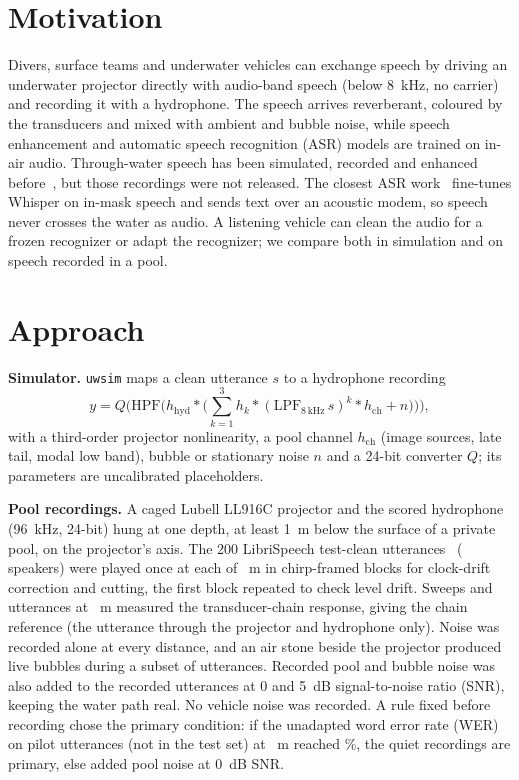 \section{Motivation}
Divers, surface teams and underwater vehicles can exchange speech by driving an underwater projector
directly with audio-band speech (below 8~kHz, no carrier) and recording it with a hydrophone. The
speech arrives reverberant, coloured by the transducers and mixed with ambient and bubble noise, while
speech enhancement and automatic speech recognition (ASR) models are trained on in-air audio.
Through-water speech has been simulated, recorded and enhanced before~\cite{nissen2017,roehrdanz2025,roehrdanz2026},
but those recordings were not released. The closest ASR work~\cite{rong2025} fine-tunes Whisper on
in-mask speech and sends text over an acoustic modem, so speech never crosses the water as audio. A
listening vehicle can clean the audio for a frozen recognizer or adapt the recognizer; we compare
both in simulation and on speech recorded in a pool.

\section{Approach}
\textbf{Simulator.} \texttt{uwsim} maps a clean utterance $s$ to a hydrophone recording
\begin{equation}
y = Q\Big(\mathrm{HPF}\big(h_{\mathrm{hyd}} * \big(\textstyle\sum_{k=1}^{3} h_k * (\mathrm{LPF}_{8\,\mathrm{kHz}}\, s)^k * h_{\mathrm{ch}} + n\big)\big)\Big),
\end{equation}
with a third-order projector nonlinearity, a pool channel $h_{\mathrm{ch}}$ (image sources, late tail,
modal low band), bubble or stationary noise $n$ and a 24-bit converter $Q$; its parameters are
uncalibrated placeholders.

\textbf{Pool recordings.} A caged Lubell LL916C projector and the scored hydrophone (96~kHz, 24-bit)
hung at one depth, at least 1~m below the surface of a private pool, on the projector's axis.
The 200 LibriSpeech test-clean utterances~\cite{panayotov2015} (\NSpk{} speakers) were played once at each
of \DistList~m in chirp-framed blocks for clock-drift correction and cutting, the first block
repeated to check level drift. Sweeps and \ChainRefN{} utterances at
\ChainRefDist~m measured the transducer-chain response, giving the chain reference (the utterance through the
projector and hydrophone only). Noise was recorded alone at every distance, and an air stone beside the
projector produced live bubbles during a subset of utterances. Recorded pool and bubble noise was also
added to the recorded utterances at 0 and 5~dB signal-to-noise ratio (SNR), keeping the water path real.
No vehicle noise was recorded. A rule fixed before recording chose the primary condition: if the
unadapted word error rate (WER) on \PilotN{} pilot utterances (not in the test set) at \PilotDist~m reached \PilotThreshold\%, the quiet
recordings are primary, else added pool noise at 0~dB SNR.

